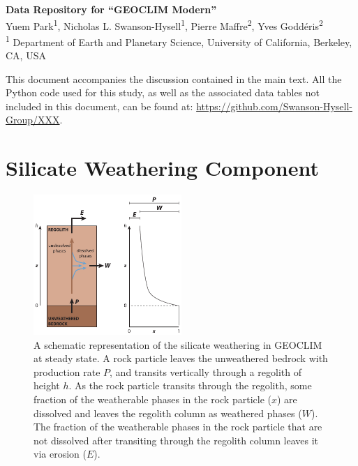 \documentclass[11pt,letterpaper]{article}
\begin{document}
\begin{flushleft}
{\Large \textbf{Data Repository for ``GEOCLIM Modern''}}
\\
Yuem Park\textsuperscript{1},
Nicholas L. Swanson-Hysell\textsuperscript{1},
Pierre Maffre\textsuperscript{2},
Yves Godd\'eris\textsuperscript{2}
\\
\bigskip
\textsuperscript{1} Department of Earth and Planetary Science, University of California, Berkeley, CA, USA
\\
\bigskip

\end{flushleft}

\linenumbers

This document accompanies the discussion contained in the main text. All the Python code used for this study, as well as the associated data tables not included in this document, can be found at: \url{https://github.com/Swanson-Hysell-Group/XXX}.

\section*{Silicate Weathering Component}

\begin{figure}[h!]
\begin{center}
	\includegraphics[width=0.5\textwidth]{../Figures/regolith_schematic.pdf}
	\caption{A schematic representation of the silicate weathering in GEOCLIM at steady state. A rock particle leaves the unweathered bedrock with production rate $P$, and transits vertically through a regolith of height $h$. As the rock particle transits through the regolith, some fraction of the weatherable phases in the rock particle ($x$) are dissolved and leaves the regolith column as weathered phases ($W$). The fraction of the weatherable phases in the rock particle that are not dissolved after transiting through the regolith column leaves it via erosion ($E$).}
	\label{fig:regolith_schematic}
\end{center}
\end{figure}
\end{document}
